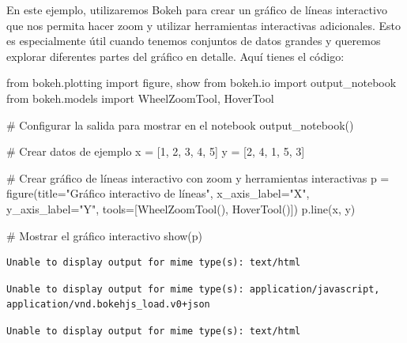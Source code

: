 \documentclass[
  a4paper,
]{article}
\newenvironment{Shaded}{}{}
\newcommand{\CommentTok}[1]{\textcolor[rgb]{0.42,0.45,0.49}{#1}}
\newcommand{\DecValTok}[1]{\textcolor[rgb]{0.00,0.36,0.77}{#1}}
\newcommand{\ImportTok}[1]{\textcolor[rgb]{0.01,0.18,0.38}{#1}}
\newcommand{\NormalTok}[1]{\textcolor[rgb]{0.14,0.16,0.18}{#1}}
\newcommand{\OperatorTok}[1]{\textcolor[rgb]{0.14,0.16,0.18}{#1}}
\newcommand{\StringTok}[1]{\textcolor[rgb]{0.01,0.18,0.38}{#1}}
\begin{document}
En este ejemplo, utilizaremos Bokeh para crear un gráfico de líneas
interactivo que nos permita hacer zoom y utilizar herramientas
interactivas adicionales. Esto es especialmente útil cuando tenemos
conjuntos de datos grandes y queremos explorar diferentes partes del
gráfico en detalle. Aquí tienes el código:

\begin{Shaded}
\begin{Highlighting}[]
\ImportTok{from}\NormalTok{ bokeh.plotting }\ImportTok{import}\NormalTok{ figure, show}
\ImportTok{from}\NormalTok{ bokeh.io }\ImportTok{import}\NormalTok{ output\_notebook}
\ImportTok{from}\NormalTok{ bokeh.models }\ImportTok{import}\NormalTok{ WheelZoomTool, HoverTool}

\CommentTok{\# Configurar la salida para mostrar en el notebook}
\NormalTok{output\_notebook()}

\CommentTok{\# Crear datos de ejemplo}
\NormalTok{x }\OperatorTok{=}\NormalTok{ [}\DecValTok{1}\NormalTok{, }\DecValTok{2}\NormalTok{, }\DecValTok{3}\NormalTok{, }\DecValTok{4}\NormalTok{, }\DecValTok{5}\NormalTok{]}
\NormalTok{y }\OperatorTok{=}\NormalTok{ [}\DecValTok{2}\NormalTok{, }\DecValTok{4}\NormalTok{, }\DecValTok{1}\NormalTok{, }\DecValTok{5}\NormalTok{, }\DecValTok{3}\NormalTok{]}

\CommentTok{\# Crear gráfico de líneas interactivo con zoom y herramientas interactivas}
\NormalTok{p }\OperatorTok{=}\NormalTok{ figure(title}\OperatorTok{=}\StringTok{"Gráfico interactivo de líneas"}\NormalTok{, x\_axis\_label}\OperatorTok{=}\StringTok{"X"}\NormalTok{, y\_axis\_label}\OperatorTok{=}\StringTok{"Y"}\NormalTok{, tools}\OperatorTok{=}\NormalTok{[WheelZoomTool(), HoverTool()])}
\NormalTok{p.line(x, y)}

\CommentTok{\# Mostrar el gráfico interactivo}
\NormalTok{show(p)}
\end{Highlighting}
\end{Shaded}

\begin{verbatim}
Unable to display output for mime type(s): text/html
\end{verbatim}

\begin{verbatim}
Unable to display output for mime type(s): application/javascript, application/vnd.bokehjs_load.v0+json
\end{verbatim}

\begin{verbatim}
Unable to display output for mime type(s): text/html
\end{verbatim}
\end{document}
